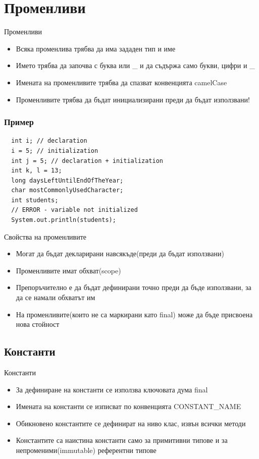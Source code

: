 \documentclass{beamer}
\begin{document}
\section{Променливи}
\begin{frame}{Променливи}
  \transdissolve
  \begin{itemize}
  \item Всяка променлива трябва да има
    зададен тип и име \pause
  \item Името трябва да започва с буква или \_
    и да съдържа само букви, цифри и \_ \pause
  \item Имената на променливите трябва да спазват конвенцията
    camelCase \pause
  \item Променливите трябва да бъдат инициализирани преди да бъдат използвани!
  \end{itemize}
\end{frame}

\begin{frame}[fragile]
  \frametitle{Пример}
  \transdissolve
\begin{lstlisting}
  int i; // declaration
  i = 5; // initialization
  int j = 5; // declaration + initialization
  int k, l = 13;
  long daysLeftUntilEndOfTheYear;
  char mostCommonlyUsedCharacter;
  int students;
  // ERROR - variable not initialized
  System.out.println(students);
\end{lstlisting}
\end{frame}

\begin{frame}{Свойства на променливите}
  \transdissolve
  \begin{itemize}
  \item Могат да бъдат декларирани навсякъде(преди да бъдат
    използвани) \pause
  \item Променливите имат обхват(scope) \pause
  \item Препоръчително е да бъдат дефинирани точно преди да бъде
    използвани, за да се намали обхватът им \pause
  \item На променливите(които не са маркирани като final) може да бъде
    присвоена нова стойност
  \end{itemize}
\end{frame}

\subsection{Константи}
\begin{frame}{Константи}
  \transdissolve
  \begin{itemize}
  \item За дефиниране на константи се използва ключовата дума final \pause
  \item Имената на константи се изписват по конвенцията CONSTANT\_NAME \pause
  \item Обикновено константите се дефинират на ниво клас, извън всички
    методи \pause
  \item Константите са наистина константи само за примитивни типове и
    за непроменими(immutable) референтни типове \pause
  \end{itemize}
\end{frame}
\end{document}
